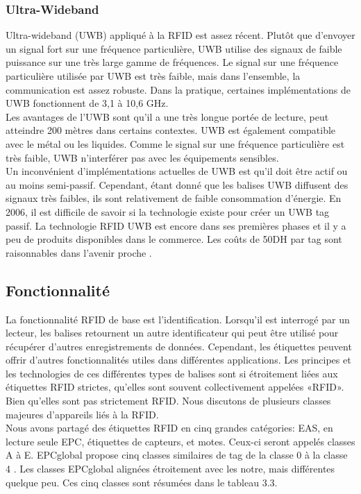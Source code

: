 \documentclass[11pt, a4paper, twoside]{book}
\begin{document}
\subsubsection{Ultra-Wideband}
Ultra-wideband (UWB) appliqué à la RFID est assez récent. Plutôt que d'envoyer un signal fort sur une fréquence particulière, UWB utilise des signaux de faible puissance sur une très large gamme de fréquences. Le signal sur une fréquence particulière utilisée par UWB est très faible, mais dans l'ensemble, la communication est assez robuste. Dans la pratique, certaines implémentations de UWB fonctionnent de 3,1 à 10,6 GHz.\\

Les avantages de l'UWB sont qu'il a une très longue portée de lecture, peut atteindre 200 mètres dans certains contextes. UWB est également compatible avec le métal ou les liquides. Comme le signal sur une fréquence particulière est très faible, UWB n'interférer pas avec les équipements sensibles.\\

Un inconvénient d'implémentations actuelles de UWB est qu'il doit être actif ou au moins semi-passif. Cependant, étant donné que les balises UWB diffusent des signaux très faibles, ils sont relativement de faible consommation d'énergie. En 2006, il est difficile de savoir si la technologie existe pour créer un UWB tag passif.
La technologie RFID UWB est encore dans ses premières phases et il y a peu de produits disponibles dans le commerce. Les coûts de 50DH par tag sont raisonnables dans l'avenir proche .
\subsection{Fonctionnalité}
La fonctionnalité RFID de base est l'identification. Lorsqu'il est interrogé par un lecteur, les balises retournent un autre identificateur qui peut être utilisé pour récupérer d'autres enregistrements de données. Cependant, les étiquettes peuvent offrir d'autres fonctionnalités utiles dans différentes applications. Les principes et les technologies de ces différentes types de balises  sont si étroitement liées aux étiquettes RFID strictes, qu'elles sont souvent collectivement appelées «RFID». Bien qu'elles sont pas strictement RFID. Nous discutons de plusieurs classes majeures d'appareils liés à la RFID.\\

Nous avons partagé des étiquettes RFID en cinq grandes catégories: EAS, en lecture seule EPC, étiquettes de capteurs, et motes. Ceux-ci seront appelés classes A à E. EPCglobal propose cinq classes similaires de tag de la classe 0 à la classe 4 . Les classes EPCglobal alignées étroitement avec les notre, mais différentes quelque peu. Ces cinq classes sont résumées dans le tableau 3.3.
\end{document}
